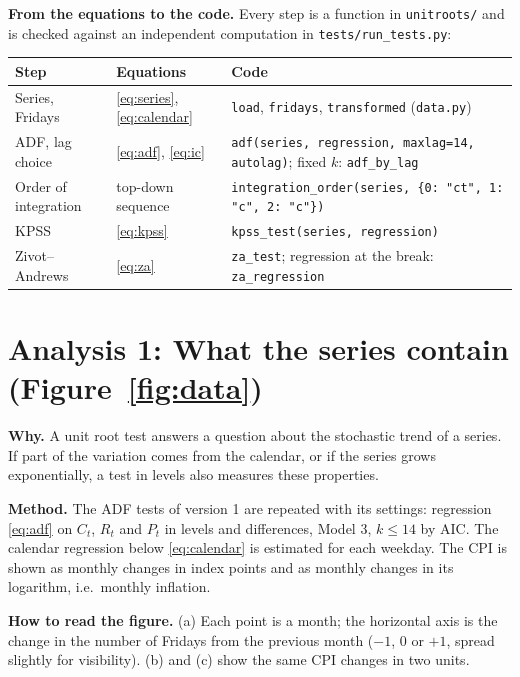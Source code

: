 \documentclass[11pt,a4paper]{article}
\begin{document}
\textbf{From the equations to the code.} Every step is a function in \texttt{unitroots/} and is checked against an independent
computation in \texttt{tests/run\_tests.py}:

\begin{center}\footnotesize
\begin{tabularx}{\textwidth}{@{}>{\raggedright\arraybackslash}p{2.1cm}>{\raggedright\arraybackslash}p{1.7cm}>{\raggedright\arraybackslash}X@{}}
\toprule
Step & Equations & Code \\
\midrule
Series, Fridays & \eqref{eq:series}, \eqref{eq:calendar} & \texttt{load}, \texttt{fridays}, \texttt{transformed} (\texttt{data.py}) \\
ADF, lag choice & \eqref{eq:adf}, \eqref{eq:ic} & \texttt{adf(series, regression, maxlag=14, autolag)}; fixed $k$: \texttt{adf\_by\_lag} \\
Order of integration & top-down sequence & \texttt{integration\_order(series, \{0: "ct", 1: "c", 2: "c"\})} \\
KPSS & \eqref{eq:kpss} & \texttt{kpss\_test(series, regression)} \\
Zivot--Andrews & \eqref{eq:za} & \texttt{za\_test}; regression at the break: \texttt{za\_regression} \\
\bottomrule
\end{tabularx}
\end{center}

\section{Analysis 1: What the series contain (Figure~\ref{fig:data})}

\textbf{Why.} A unit root test answers a question about the stochastic trend of a series. If part of the variation comes from the
calendar, or if the series grows exponentially, a test in levels also measures these properties.

\textbf{Method.} The ADF tests of version 1 are repeated with its settings: regression \eqref{eq:adf} on $C_t$, $R_t$ and $P_t$
in levels and differences, Model 3, $k \le 14$ by AIC. The calendar regression below \eqref{eq:calendar} is estimated for each
weekday. The CPI is shown as monthly changes in index points and as monthly changes
in its logarithm, i.e.\ monthly inflation.

\textbf{How to read the figure.} (a) Each point is a month; the horizontal axis is the change in the number of Fridays from the
previous month ($-1$, $0$ or $+1$, spread slightly for visibility). (b) and (c) show the same CPI changes in two units.
\end{document}
